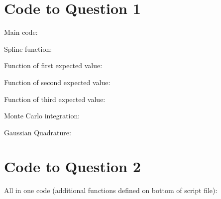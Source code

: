 \documentclass{article}
\begin{document}
\begin{appendices}
\section{Code to Question 1}
Main code:

Spline function:

Function of first expected value:

Function of second expected value:

Function of third expected value:

Monte Carlo integration:

Gaussian Quadrature:

\section{Code to Question 2}
All in one code (additional functions defined on bottom of script file):

\end{appendices}
\end{document}
